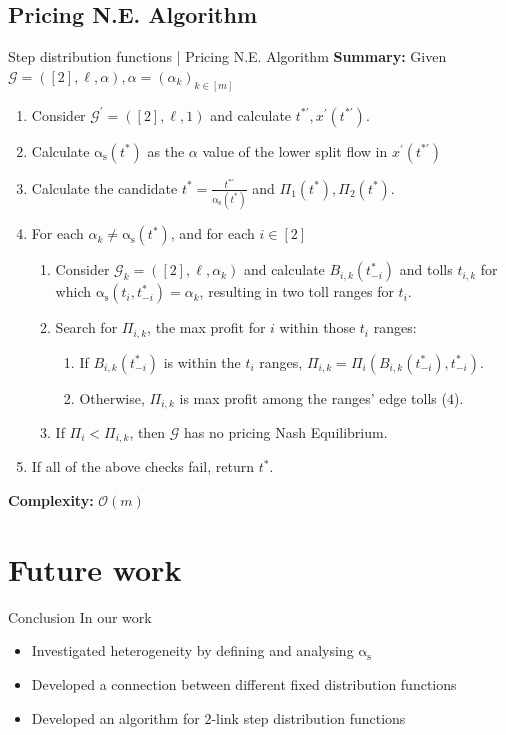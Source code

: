 \documentclass{beamer}
\newcommand{\as}{\mathrm{\alpha_s}}
\newcommand{\Gm}{\mathcal{G}}
\begin{document}
\subsection*{Pricing N.E. Algorithm}

\begin{frame}{Step distribution functions | Pricing N.E. Algorithm}
	\textbf{Summary:} Given $\Gm = ([2], \ell, \alpha), \alpha = (\alpha_k)_{k \in [m]}$
	\begin{enumerate}
		\item Consider $\Gm^\prime = ([2], \ell, 1)$ and calculate $t^{*\prime}, x^\prime(t^{*\prime})$.
		\item Calculate $\as(t^*)$ as the $\alpha$ value of the lower split flow in $x^\prime(t^{*\prime})$
		\item Calculate the candidate $t^* = \tfrac{t^{*\prime}}{\as(t^*)}$ and $\Pi_1(t^*), \Pi_2(t^*)$.
		\item For each $\alpha_k \ne \as(t^*)$, and for each $i \in [2]$
		\begin{enumerate}[$4.1$]
			\item Consider $\Gm_k = ([2], \ell, \alpha_k)$ and calculate $B_{i, k}(t_{-i}^*)$ and tolls $t_{i, k}$ for which $\as(t_i, t_{-i}^*) = \alpha_k$, resulting in two toll ranges for $t_i$.
			\item Search for $\Pi_{i, k}$, the max profit for $i$ within those $t_i$ ranges:
			\begin{enumerate}[$4.2.1$]
				\item If $B_{i, k}(t_{-i}^*)$ is within the $t_i$ ranges, $\Pi_{i, k} = \Pi_i(B_{i, k}(t_{-i}^*), t_{-i}^*)$.
				\item Otherwise, $\Pi_{i, k}$ is max profit among the ranges' edge tolls ($4$).
			\end{enumerate}
			\item If $\Pi_i < \Pi_{i, k}$, then $\Gm$ has no pricing Nash Equilibrium.
		\end{enumerate}
		\item If all of the above checks fail, return $t^*$.
	\end{enumerate}
	\textbf{Complexity:} $\mathcal{O}(m)$
\end{frame}

\section{Future work}

\begin{frame}{Conclusion}
	In our work
	\begin{itemize}
		\item Investigated heterogeneity by defining and analysing $\as$
		\item Developed a connection between different fixed distribution functions
		\item Developed an algorithm for $2$-link step distribution functions
	\end{itemize}
\end{frame}
\end{document}
